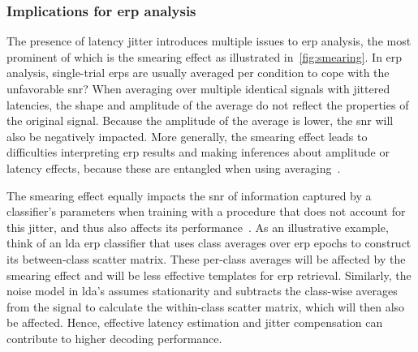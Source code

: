 \subsubsection{Implications for \ac{erp} analysis}

The presence of latency jitter introduces multiple issues to \ac{erp} analysis, the
most prominent of which is the smearing effect as illustrated
in~\autoref{fig:smearing}. In \ac{erp} analysis, single-trial \acp{erp} are usually
averaged per condition to cope with the unfavorable \ac{snr}?
When averaging over multiple identical signals with jittered latencies, the shape
and amplitude of the average do not reflect the properties
of the original signal.
Because the amplitude of the average is lower, the \ac{snr} will also be negatively impacted.
More generally, the smearing effect leads to difficulties interpreting \ac{erp}
results and making inferences about amplitude or latency effects, because these
are entangled when using averaging~\cite{Woody1967, Pfefferbaum1980, McDowell2003, Verleger2005,
	Roth2007, Walhovd2008, Poli2010, Luck2014}.


The smearing effect equally impacts the \ac{snr} of information captured by a
classifier's parameters when training with a procedure that does not account for
this jitter, and thus also affects its performance~\cite{Thompson2012}.
As an illustrative example, think of an \ac{lda} \ac{erp} classifier that uses
class averages over \ac{erp} epochs to construct its between-class scatter
matrix.
These per-class averages will be affected by the smearing effect and will be
less effective templates for \ac{erp} retrieval.
Similarly, the noise model in \ac{lda}'s  assumes stationarity and subtracts
the class-wise averages from the signal to calculate
the within-class scatter matrix, which will then also be affected.
Hence, effective latency estimation and jitter compensation can contribute to higher
decoding performance.

